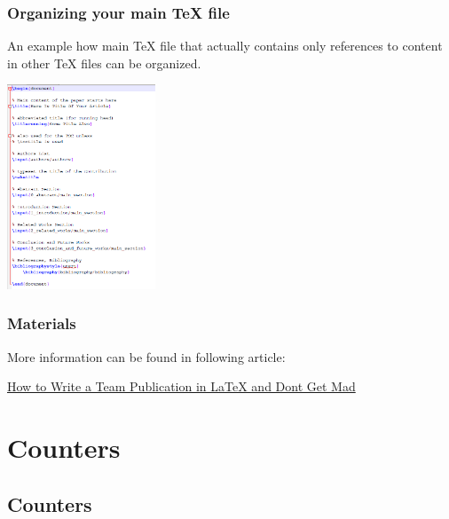 \begin{frame}  \frametitle{Organizing your main TeX file}
	
	An example how main TeX file that actually contains only references to content in other TeX files can be organized.
	
	\vspace{0.2cm}
	
	\begin{center}
		\includegraphics[height=2.4in]{tips/images/sampleMainTeXFile}
	\end{center}
	
\end{frame}


\begin{frame}  \frametitle{Materials}
	
	More information can be found in following article:
	
	\vspace{0.2cm}
	
	\begin{center}
			\href{http://vdmitriyev.github.io/blog/how-to-write-a-team-publication-in-latex-and-dont-get-mad.html}{How to Write a Team Publication in LaTeX and Dont Get Mad}
	\end{center}
	
\end{frame}


\section[Counters]{Counters}
\subsection[Counters]{Counters}


